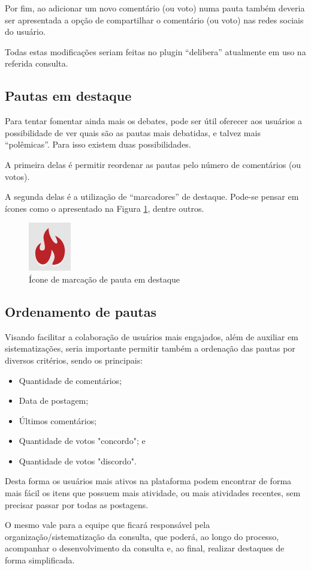 	Por fim, ao adicionar um novo comentário (ou voto) numa pauta também deveria ser apresentada a opção de compartilhar o comentário (ou voto) nas redes sociais do usuário.

	Todas estas modificações seriam feitas no plugin “delibera” atualmente em uso na referida consulta.

\subsection{Pautas em destaque}
Para tentar fomentar ainda mais os debates, pode ser útil oferecer aos usuários a possibilidade de ver quais são as pautas mais debatidas, e talvez mais ``polêmicas''. Para isso existem duas possibilidades.

	A primeira delas é permitir reordenar as pautas pelo número de comentários (ou votos).

	A segunda delas é a utilização de ``marcadores'' de destaque. Pode-se pensar em ícones como o apresentado na Figura \ref{fig:mcivil-icone-pauta-destaque}, dentre outros.
	    \begin{figure}[htb]%
        \begin{center}
            \includegraphics[scale=0.7]{./imagens/hot-topic.png}%
        \end{center}%
        \caption{Ícone de marcação de pauta em destaque \label{fig:mcivil-icone-pauta-destaque}}%
    \end{figure}%

\subsection{Ordenamento de pautas}
Visando facilitar a colaboração de usuários mais engajados, além de auxiliar em sistematizações, seria importante permitir também a ordenação das pautas por diversos critérios, sendo os principais:
\begin{itemize}
\item Quantidade de comentários;
\item Data de postagem;
\item Últimos comentários;
\item Quantidade de votos "concordo"; e
\item Quantidade de votos "discordo".
\end{itemize}

Desta forma os usuários mais ativos na plataforma podem encontrar de forma mais fácil os itens que possuem mais atividade, ou mais atividades recentes, sem precisar passar por todas as postagens.

O mesmo vale para a equipe que ficará responsável pela organização/sistematização da consulta, que poderá, ao longo do processo, acompanhar o desenvolvimento da consulta e, ao final, realizar destaques de forma simplificada.